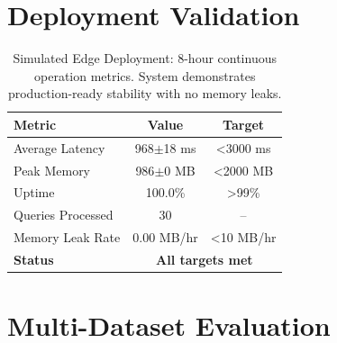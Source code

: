 \documentclass[letterpaper]{article}
\begin{document}
\section*{Deployment Validation}


\begin{table}[t]
\centering
\caption{Simulated Edge Deployment: 8-hour continuous operation metrics.
System demonstrates production-ready stability with no memory leaks.}
\label{tab:deployment}
\begin{tabular}{l c c}
\toprule
\textbf{Metric} & \textbf{Value} & \textbf{Target} \\
\midrule
Average Latency & 968$\pm$18 ms & <3000 ms \\
Peak Memory & 986$\pm$0 MB & <2000 MB \\
Uptime & 100.0\% & >99\% \\
Queries Processed & 30 & -- \\
Memory Leak Rate & 0.00 MB/hr & <10 MB/hr \\
\midrule
\textbf{Status} & \multicolumn{2}{c}{\textbf{All targets met}} \\

\bottomrule
\end{tabular}
\end{table}

\clearpage

\section*{Multi-Dataset Evaluation}
\end{document}
